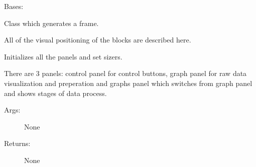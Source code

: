 \documentclass[letterpaper,10pt,english]{sphinxmanual}
\begin{document}
\begin{fulllineitems}
\label{\detokenize{GUI:GUI.MyFrame}}
Bases: 

Class which generates a frame.

All of the visual positioning of the blocks are described here.

\begin{fulllineitems}
\label{\detokenize{GUI:GUI.MyFrame.init_frame}}
Initializes all the panels and set sizers.

There are 3 panels: control panel for control buttons, graph panel
for raw data visualization and preperation and graphs panel which
switches from graph panel and shows stages of data process.
\begin{description}
\item[{Args:}] \leavevmode
None

\item[{Returns:}] \leavevmode
None

\end{description}

\end{fulllineitems}


\end{fulllineitems}

\end{document}
